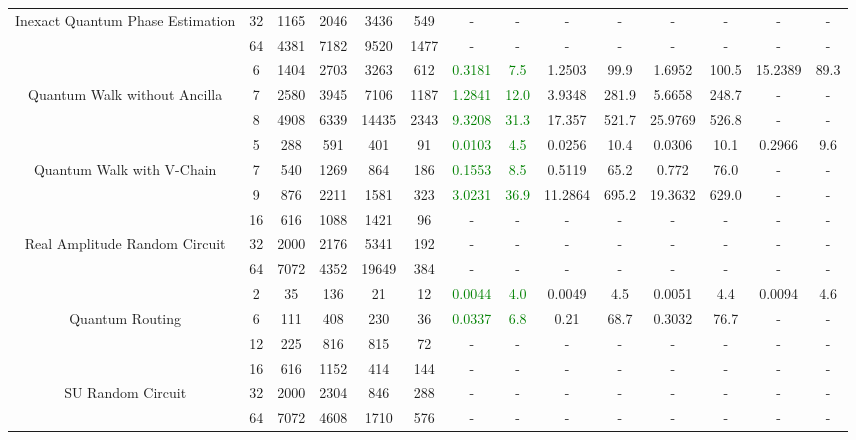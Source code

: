 \begin{table}[htb]
{\begin{tabular}{|c|c|c|c|c|c|c|c|c|c|c|c|c|c|}
Inexact Quantum Phase Estimation & 
32 & 1165 & 2046 & 3436 & 549
 & - & -
 & - & -
 & - & -
 & - & -
 \\
 & 
64 & 4381 & 7182 & 9520 & 1477
 & - & -
 & - & -
 & - & -
 & - & -
 \\
\hline
 & 
6 & 1404 & 2703 & 3263 & 612
 & \textcolor{green}{0.3181} & \textcolor{green}{7.5}
 & 1.2503 & 99.9
 & 1.6952 & 100.5
 & 15.2389 & 89.3
 \\
Quantum Walk without Ancilla & 
7 & 2580 & 3945 & 7106 & 1187
 & \textcolor{green}{1.2841} & \textcolor{green}{12.0}
 & 3.9348 & 281.9
 & 5.6658 & 248.7
 & - & -
 \\
 & 
8 & 4908 & 6339 & 14435 & 2343
 & \textcolor{green}{9.3208} & \textcolor{green}{31.3}
 & 17.357 & 521.7
 & 25.9769 & 526.8
 & - & -
 \\
\hline
 & 
5 & 288 & 591 & 401 & 91
 & \textcolor{green}{0.0103} & \textcolor{green}{4.5}
 & 0.0256 & 10.4
 & 0.0306 & 10.1
 & 0.2966 & 9.6
 \\
Quantum Walk with V-Chain & 
7 & 540 & 1269 & 864 & 186
 & \textcolor{green}{0.1553} & \textcolor{green}{8.5}
 & 0.5119 & 65.2
 & 0.772 & 76.0
 & - & -
 \\
 & 
9 & 876 & 2211 & 1581 & 323
 & \textcolor{green}{3.0231} & \textcolor{green}{36.9}
 & 11.2864 & 695.2
 & 19.3632 & 629.0
 & - & -
 \\
\hline
 & 
16 & 616 & 1088 & 1421 & 96
 & - & -
 & - & -
 & - & -
 & - & -
 \\
Real Amplitude Random Circuit & 
32 & 2000 & 2176 & 5341 & 192
 & - & -
 & - & -
 & - & -
 & - & -
 \\
 & 
64 & 7072 & 4352 & 19649 & 384
 & - & -
 & - & -
 & - & -
 & - & -
 \\
\hline
 & 
2 & 35 & 136 & 21 & 12
 & \textcolor{green}{0.0044} & \textcolor{green}{4.0}
 & 0.0049 & 4.5
 & 0.0051 & 4.4
 & 0.0094 & 4.6
 \\
Quantum Routing & 
6 & 111 & 408 & 230 & 36
 & \textcolor{green}{0.0337} & \textcolor{green}{6.8}
 & 0.21 & 68.7
 & 0.3032 & 76.7
 & - & -
 \\
 & 
12 & 225 & 816 & 815 & 72
 & - & -
 & - & -
 & - & -
 & - & -
 \\
\hline
 & 
16 & 616 & 1152 & 414 & 144
 & - & -
 & - & -
 & - & -
 & - & -
 \\
SU Random Circuit & 
32 & 2000 & 2304 & 846 & 288
 & - & -
 & - & -
 & - & -
 & - & -
 \\
 & 
64 & 7072 & 4608 & 1710 & 576
 & - & -
 & - & -
 & - & -
 & - & -
 \\

\end{tabular}}
\end{table}
